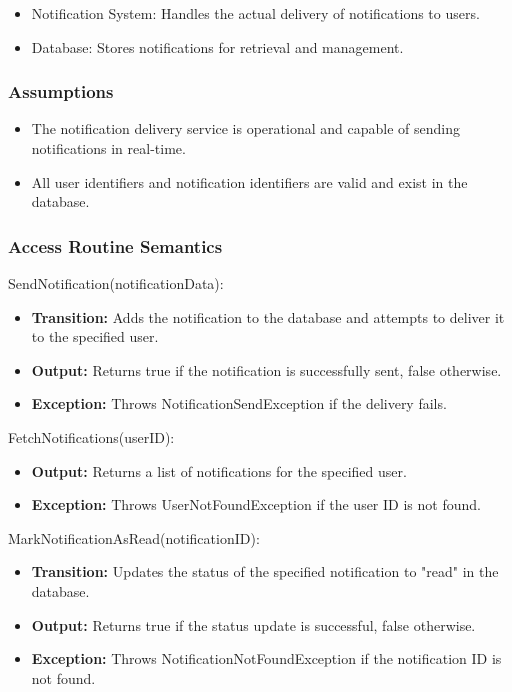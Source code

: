 \documentclass[12pt, titlepage]{article}
\begin{document}
\begin{itemize}
  \item Notification System: Handles the actual delivery of notifications to users.
  \item Database: Stores notifications for retrieval and management.
\end{itemize}

\subsubsection{Assumptions}

\begin{itemize}
  \item The notification delivery service is operational and capable of sending notifications in real-time.
  \item All user identifiers and notification identifiers are valid and exist in the database.
\end{itemize}

\subsubsection{Access Routine Semantics}

\noindent SendNotification(notificationData):
\begin{itemize}
  \item \textbf{Transition:} Adds the notification to the database and attempts to deliver it to the specified user.
  \item \textbf{Output:} Returns true if the notification is successfully sent, false otherwise.
  \item \textbf{Exception:} Throws NotificationSendException if the delivery fails.
\end{itemize}

\noindent FetchNotifications(userID):
\begin{itemize}
  \item \textbf{Output:} Returns a list of notifications for the specified user.
  \item \textbf{Exception:} Throws UserNotFoundException if the user ID is not found.
\end{itemize}

\noindent MarkNotificationAsRead(notificationID):
\begin{itemize}
  \item \textbf{Transition:} Updates the status of the specified notification to "read" in the database.
  \item \textbf{Output:} Returns true if the status update is successful, false otherwise.
  \item \textbf{Exception:} Throws NotificationNotFoundException if the notification ID is not found.
\end{itemize}
\end{document}
